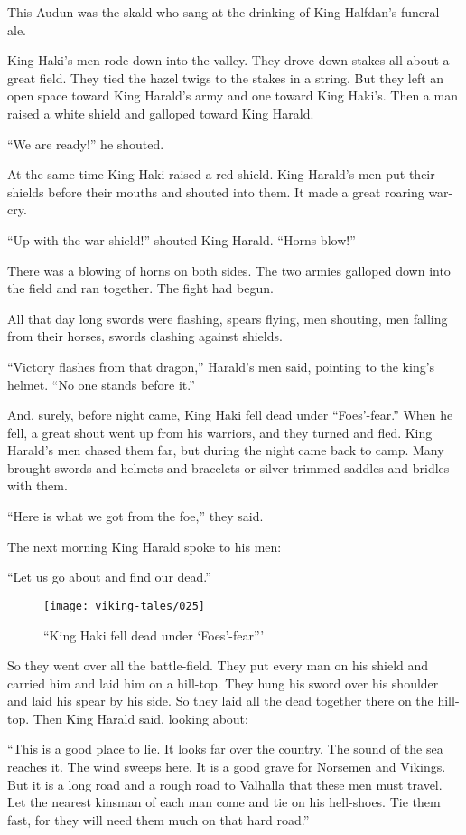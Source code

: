 This Audun was the skald who sang at the drinking of King Halfdan's
funeral ale.

King Haki's men rode down into the valley. They drove down stakes all
about a great field. They tied the hazel twigs to the stakes in a
string. But they left an open space toward King Harald's army and one
toward King Haki's. Then a man raised a white shield and galloped toward
King Harald.

``We are ready!'' he shouted.

At the same time King Haki raised a red shield. King Harald's men put
their shields before their mouths and shouted into them. It made a great
roaring war-cry.

``Up with the war shield!'' shouted King Harald. ``Horns blow!''

There was a blowing of horns on both sides. The two armies galloped down
into the field and ran together. The fight had begun.

All that day long swords were flashing, spears flying, men shouting, men
falling from their horses, swords clashing against shields.

``Victory flashes from that dragon,'' Harald's men said, pointing to the
king's helmet. ``No one stands before it.''

And, surely, before night came, King Haki fell dead under
``Foes'-fear.'' When he fell, a great shout went up from his warriors,
and they turned and fled. King Harald's men chased them far, but during
the night came back to camp. Many brought swords and helmets and
bracelets or silver-trimmed saddles and bridles with them.

``Here is what we got from the foe,'' they said.

The next morning King Harald spoke to his men:

``Let us go about and find our dead.''

\begin{figure}
    \centering
    \texttt{[image: viking-tales/025]}
    \caption{``King Haki fell dead under `Foes'-fear'''}
\end{figure}

So they went over all the battle-field. They put every man on his shield
and carried him and laid him on a hill-top. They hung his sword over his
shoulder and laid his spear by his side. So they laid all the dead
together there on the hill-top. Then King Harald said, looking about:

``This is a good place to lie. It looks far over the country. The sound
of the sea reaches it. The wind sweeps here. It is a good grave for
Norsemen and Vikings. But it is a long road and a rough road to Valhalla
that these men must travel. Let the nearest kinsman of each man come and
tie on his hell-shoes. Tie them fast, for they will need them much on
that hard road.''

